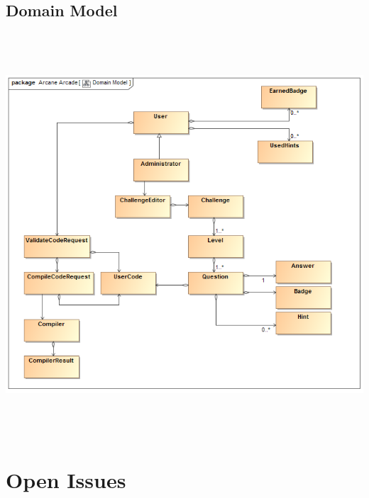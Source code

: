 \documentclass[english]{article}
\begin{document}
		
		\subsection{Domain Model}
			\includegraphics[width=15cm,height=15cm,keepaspectratio]{domainModel.png}
		

	\newpage
	\section{Open Issues}		


		
\end{document}
